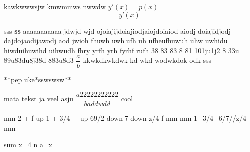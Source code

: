 \documentclass{article}
\begin{document}
kawkwwwsjw kmwmmws nwwdw $y'(x) = p(x) $ 
\[ y'(x) \] 

sss 
\textbf{ss} 
aaaaaaaaaaa jdwjd wjd ojoiajijdoiajiodjaiojdoiaiod aiodj doiajidjodj dajdojaodijawodj aod jwioh fhuwh uwh ufh uh ufheufhuwuh uhw uwhidu hiwduihuwihd uihwudh fhry yrfh yrh fyrhf rufh 38 83 83 8 81 101ju1j2 8 33u 89u83du8j38d 883u8d3 $\dfrac{a}{b} $ kkwkdkwkdwk kd wkd wodwkdok odk sss 

**pep uke*sswswsw** 

mata tekst ja veel asju $\dfrac{a22222222222}{baddwdd} $ cool 

mm 2 + f up 1 + 3/4 + up 69/2 down 7 down z/4 f  mm 
mm 1+3/4+6/7//z/4 mm 

sum x=4 n a_x 
\end{document}
